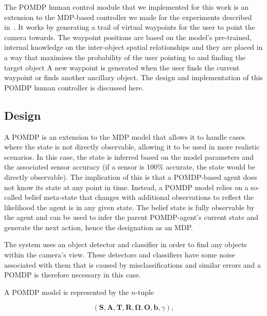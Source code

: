 \documentclass[runningheads]{llncs}
\begin{document}
The POMDP human control module that we implemented for this work is an extension to the MDP-based controller we made for the experiments described in~\cite{lock2019active}.
It works by generating a trail of virtual waypoints for the user to point the camera towards.
The waypoint positions are based on the model's pre-trained, internal knowledge on the inter-object spatial relationships and they are placed in a way that maximises the probability of the user pointing to and finding the target object
A new waypoint is generated when the user finds the current waypoint or finds another ancillary object.
The design and implementation of this POMDP human controller is discussed here.

\subsection{Design}

A POMDP is an extension to the MDP model that allows it to handle cases where the state is not directly observable, allowing it to be used in more realistic scenarios. 
In this case, the state is inferred based on the model parameters and the associated sensor accuracy (if a sensor is 100\% accurate, the state would be directly observable).
The implication of this is that a POMDP-based agent does not know its state at any point in time.
Instead, a POMDP model relies on a so-called belief meta-state that changes with additional observations to reflect the likelihood the agent is in any given state.
The belief state is fully observable by the agent and can be used to infer the parent POMDP-agent's current state and generate the next action, hence the designation as an MDP.\@

The system uses an object detector and classifier in order to find any objects within the camera's view.
These detectors and classifiers have some noise associated with them that is caused by misclassifications and similar errors and a POMDP is therefore necessary in this case.

A POMDP model is represented by the $n$-tuple

\begin{equation}
  (\mathbf{S}, \mathbf{A}, \mathbf{T}, \mathbf{R}, \mathbf{\Omega}, \mathbf{O}, \mathbf{b}, \gamma),
\end{equation}
\end{document}
